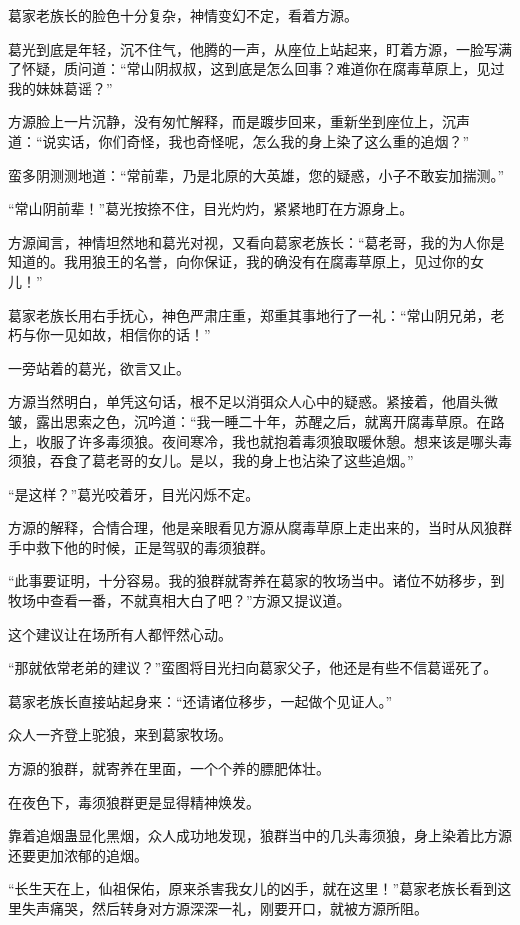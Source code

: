 \begin{this_body}
葛家老族长的脸色十分复杂，神情变幻不定，看着方源。

葛光到底是年轻，沉不住气，他腾的一声，从座位上站起来，盯着方源，一脸写满了怀疑，质问道：“常山阴叔叔，这到底是怎么回事？难道你在腐毒草原上，见过我的妹妹葛谣？”

方源脸上一片沉静，没有匆忙解释，而是踱步回来，重新坐到座位上，沉声道：“说实话，你们奇怪，我也奇怪呢，怎么我的身上染了这么重的追烟？”

蛮多阴测测地道：“常前辈，乃是北原的大英雄，您的疑惑，小子不敢妄加揣测。”

“常山阴前辈！”葛光按捺不住，目光灼灼，紧紧地盯在方源身上。

方源闻言，神情坦然地和葛光对视，又看向葛家老族长：“葛老哥，我的为人你是知道的。我用狼王的名誉，向你保证，我的确没有在腐毒草原上，见过你的女儿！”

葛家老族长用右手抚心，神色严肃庄重，郑重其事地行了一礼：“常山阴兄弟，老朽与你一见如故，相信你的话！”

一旁站着的葛光，欲言又止。

方源当然明白，单凭这句话，根不足以消弭众人心中的疑惑。紧接着，他眉头微皱，露出思索之色，沉吟道：“我一睡二十年，苏醒之后，就离开腐毒草原。在路上，收服了许多毒须狼。夜间寒冷，我也就抱着毒须狼取暖休憩。想来该是哪头毒须狼，吞食了葛老哥的女儿。是以，我的身上也沾染了这些追烟。”

“是这样？”葛光咬着牙，目光闪烁不定。

方源的解释，合情合理，他是亲眼看见方源从腐毒草原上走出来的，当时从风狼群手中救下他的时候，正是驾驭的毒须狼群。

“此事要证明，十分容易。我的狼群就寄养在葛家的牧场当中。诸位不妨移步，到牧场中查看一番，不就真相大白了吧？”方源又提议道。

这个建议让在场所有人都怦然心动。

“那就依常老弟的建议？”蛮图将目光扫向葛家父子，他还是有些不信葛谣死了。

葛家老族长直接站起身来：“还请诸位移步，一起做个见证人。”

众人一齐登上驼狼，来到葛家牧场。

方源的狼群，就寄养在里面，一个个养的膘肥体壮。

在夜色下，毒须狼群更是显得精神焕发。

靠着追烟蛊显化黑烟，众人成功地发现，狼群当中的几头毒须狼，身上染着比方源还要更加浓郁的追烟。

“长生天在上，仙祖保佑，原来杀害我女儿的凶手，就在这里！”葛家老族长看到这里失声痛哭，然后转身对方源深深一礼，刚要开口，就被方源所阻。


\end{this_body}
